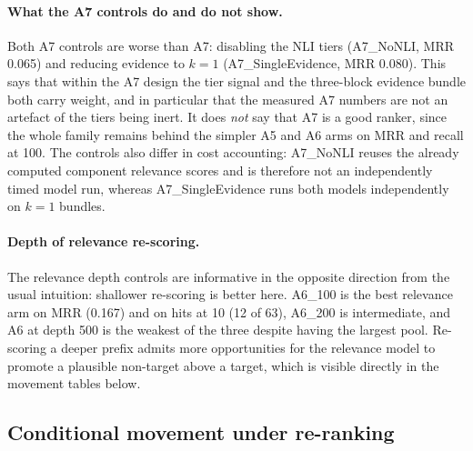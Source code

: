 \documentclass[11pt,a4paper]{article}
\begin{document}
\paragraph{What the A7 controls do and do not show.} Both A7 controls are worse than A7: disabling the NLI tiers (A7\_NoNLI, MRR 0.065) and reducing evidence to $k=1$ (A7\_SingleEvidence, MRR 0.080). This says that within the A7 design the tier signal and the three-block evidence bundle both carry weight, and in particular that the measured A7 numbers are not an artefact of the tiers being inert. It does \emph{not} say that A7 is a good ranker, since the whole family remains behind the simpler A5 and A6 arms on MRR and recall at 100. The controls also differ in cost accounting: A7\_NoNLI reuses the already computed component relevance scores and is therefore not an independently timed model run, whereas A7\_SingleEvidence runs both models independently on $k=1$ bundles.

\paragraph{Depth of relevance re-scoring.} The relevance depth controls are informative in the opposite direction from the usual intuition: shallower re-scoring is better here. A6\_100 is the best relevance arm on MRR (0.167) and on hits at 10 (12 of 63), A6\_200 is intermediate, and A6 at depth 500 is the weakest of the three despite having the largest pool. Re-scoring a deeper prefix admits more opportunities for the relevance model to promote a plausible non-target above a target, which is visible directly in the movement tables below.

\subsection{Conditional movement under re-ranking}
\end{document}
